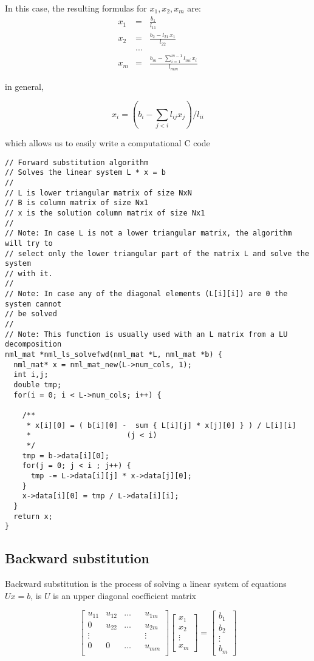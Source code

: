 In this case, the resulting formulas for $x_1, x_2, x_m$ are:
$$
\begin{array}{rcl}
x_{1} & = & \displaystyle \frac{b_{1}}{l_{11}} \\[4mm]
x_{2} & = & \displaystyle \frac{b_{2}-l_{21}\,x_{1}}{l_{22}} \\[2mm]
& ...&  \\
x_{m} & = & \displaystyle \frac{\displaystyle b_{m} - \sum_{i=1}^{m-1} l_{mi}\,x_{i}}{l_{mm}}
\end{array}
$$

in general,

$$
x_i = \left( b_i - \sum_{j<i} l_{ij}x_j \right) / l_{ii}
$$

which allows us to easily write a computational C code

\begin{verbatim}
// Forward substitution algorithm
// Solves the linear system L * x = b
//
// L is lower triangular matrix of size NxN
// B is column matrix of size Nx1
// x is the solution column matrix of size Nx1
//
// Note: In case L is not a lower triangular matrix, the algorithm will try to
// select only the lower triangular part of the matrix L and solve the system
// with it.
//
// Note: In case any of the diagonal elements (L[i][i]) are 0 the system cannot
// be solved
//
// Note: This function is usually used with an L matrix from a LU decomposition
nml_mat *nml_ls_solvefwd(nml_mat *L, nml_mat *b) {
  nml_mat* x = nml_mat_new(L->num_cols, 1);
  int i,j;
  double tmp;
  for(i = 0; i < L->num_cols; i++) {
  
    /**
     * x[i][0] = ( b[i][0] -  sum { L[i][j] * x[j][0] } ) / L[i][i]
     *                      (j < i)
     */
    tmp = b->data[i][0];
    for(j = 0; j < i ; j++) {
      tmp -= L->data[i][j] * x->data[j][0];
    }
    x->data[i][0] = tmp / L->data[i][i];
  }
  return x;
}
\end{verbatim}

\subsection{Backward substitution}

Backward substitution is the process of solving a linear system of equations $Ux = b$, is $U$ is an upper diagonal coefficient matrix

$$
\begin{bmatrix}
u_{11} & u_{12} & \ldots && u_{1m} \\
0 & u_{22} & \ldots && u_{2m} \\
\vdots & & & & \vdots \\
0 & 0 & \ldots && u_{mm} \\
\end{bmatrix}
\begin{bmatrix}
x_{1} \\
x_{2} \\
\vdots   \\
x_{m}
\end{bmatrix}
=
\begin{bmatrix}
b_{1} \\
b_{2} \\
\vdots \\
b_{m}
\end{bmatrix}
$$

